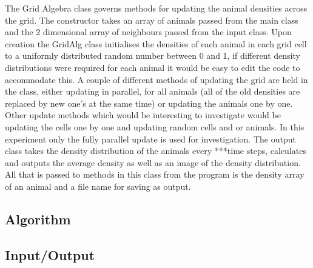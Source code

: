\documentclass[11pt]{report}
\begin{document}
          The Grid Algebra class governs methods for updating the animal densities across the  grid. The constructor takes an array of animals passed from the main class and the 2 dimensional array of neighbours passed from the input class. Upon creation the GridAlg class initialises the densities of each animal in each grid cell to a uniformly distributed random number between 0 and 1, if different density distributions were required for each animal it would be easy to edit the code to accommodate this. A couple of different methods of updating the grid are held in the class, either updating in parallel, for all animals (all of the old densities are replaced by new one's at the same time) or updating the animals one by one. Other update methods which would be interesting to investigate would be updating the cells one by one and updating random cells and or animals. In this experiment only the fully parallel update is used for investigation.
          The output class takes the density distribution of the animals every ***time steps, calculates and outputs the average density as well as an image of the density distribution. All that is passed to methods in this class from the program is the density array of an animal and a file name for saving as output. 
      \subsection{Algorithm} %
      \subsection{Input/Output} %
      
          
       
      
\end{document}

